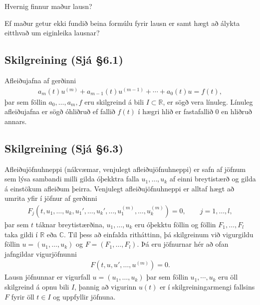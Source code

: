 \documentclass[a4paper,10pt,icelandic]{sphinxmanual}
\begin{document}
Hvernig finnur maður lausn?

Ef maður getur ekki fundið beina formúlu fyrir lausn er samt hægt að
álykta eitthvað um eiginleika lausnar?


\subsection{Skilgreining (Sjá \S{}6.1)}
\label{\detokenize{Kafli06:id2}}
Afleiðujafna af gerðinni
\begin{equation*}
\begin{split}a_m(t)u^{(m)}+a_{m-1}(t)u^{(m-1)}+\cdots+a_0(t)u
 =f(t),\end{split}
\end{equation*}
þar sem föllin \(a_0,\dots,a_m,f\) eru skilgreind á bili \(I\subset \mathbb{R}\), er sögð vera línuleg. Línuleg afleiðujafna er sögð óhliðruð ef fallið \(f(t)\) í hægri hlið er fastafallið 0 en hliðruð annars.


\subsection{Skilgreining (Sjá \S{}6.3)}
\label{\detokenize{Kafli06:skilgreining-sja-6-3}}
Afleiðujöfnuhneppi (nákvæmar, venjulegt afleiðujöfnuhneppi) er safn af jöfnum sem lýsa sambandi milli gilda óþekktra falla \(u_1, \ldots, u_k\) af einni breytistærð og gilda á einstökum afleiðum þeirra. Venjulegt afleiðujöfnuhneppi er alltaf hægt að umrita yfir í jöfnur af gerðinni
\begin{equation*}
\begin{split}F_j(t,u_1,\dots,u_k,u_1',\dots,u_k',\dots,
u_1^{(m)},\dots,u_k^{(m)})=0,\qquad
j=1,\dots,l,\end{split}
\end{equation*}
þar sem \(t\) táknar breytistærðina, \(u_1,\dots,u_k\) eru óþekktu föllin og föllin \(F_1,\dots,F_l\) taka gildi í \(\mathbb{R}\) eða \({\mathbb{C}}\). Til þess að einfalda ritháttinn, þá skilgreinum við vigurgildu föllin \(u=(u_1,\dots,u_k)\) og \(F=(F_1,\dots,F_l)\). Þá eru jöfnurnar hér að ofan jafngildar vigurjöfnunni
\begin{equation*}
\begin{split}F(t,u,u',\dots,u^{(m)})=0.\end{split}
\end{equation*}
Lausn jöfnunnar er vigurfall \(u=(u_1,\dots,u_k)\) þar sem föllin \(u_1, \cdots, u_k\) eru öll skilgreind á opnu bili \(I\), þannig að vigurinn \(u(t)\) er í skilgreiningarmengi fallsins \(F\) fyrir öll \(t\in I\) og uppfyllir jöfnuna.
\end{document}

